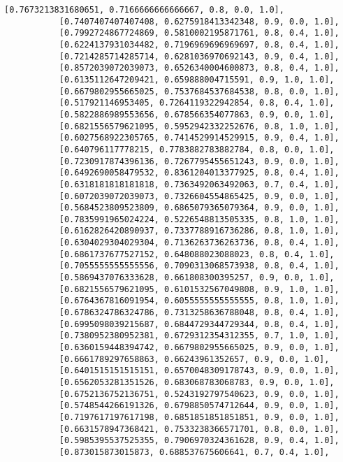 \documentclass[11pt]{article}
\begin{document}
\begin{Verbatim}[commandchars=\\\{\}]
           [0.7673213831680651, 0.7166666666666667, 0.8, 0.0, 1.0],
           [0.7407407407407408, 0.6275918413342348, 0.9, 0.0, 1.0],
           [0.7992724867724869, 0.5810002195871761, 0.8, 0.4, 1.0],
           [0.6224137931034482, 0.7196969696969697, 0.8, 0.4, 1.0],
           [0.7214285714285714, 0.6281036970692143, 0.9, 0.4, 1.0],
           [0.8572039072039073, 0.6526340004600873, 0.8, 0.4, 1.0],
           [0.6135112647209421, 0.659888004715591, 0.9, 1.0, 1.0],
           [0.6679802955665025, 0.7537684537684538, 0.8, 0.0, 1.0],
           [0.517921146953405, 0.7264119322942854, 0.8, 0.4, 1.0],
           [0.5822886989553656, 0.678566354077863, 0.9, 0.0, 1.0],
           [0.6821556579621095, 0.5952942332252676, 0.8, 1.0, 1.0],
           [0.6027568922305765, 0.7414529914529915, 0.9, 0.4, 1.0],
           [0.640796117778215, 0.7783882783882784, 0.8, 0.0, 1.0],
           [0.7230917874396136, 0.7267795455651243, 0.9, 0.0, 1.0],
           [0.6492690058479532, 0.8361204013377925, 0.8, 0.4, 1.0],
           [0.6318181818181818, 0.7363492063492063, 0.7, 0.4, 1.0],
           [0.6072039072039073, 0.7326604554865425, 0.9, 0.0, 1.0],
           [0.5684523809523809, 0.6865079365079364, 0.9, 0.0, 1.0],
           [0.7835991965024224, 0.5226548813505335, 0.8, 1.0, 1.0],
           [0.6162826420890937, 0.7337788916736286, 0.8, 1.0, 1.0],
           [0.6304029304029304, 0.7136263736263736, 0.8, 0.4, 1.0],
           [0.6861737677527152, 0.648088023088023, 0.8, 0.4, 1.0],
           [0.7055555555555556, 0.7090313068573938, 0.8, 0.4, 1.0],
           [0.5869437076333628, 0.661808300395257, 0.9, 0.0, 1.0],
           [0.6821556579621095, 0.6101532567049808, 0.9, 1.0, 1.0],
           [0.6764367816091954, 0.6055555555555555, 0.8, 1.0, 1.0],
           [0.6786324786324786, 0.7313258636788048, 0.8, 0.4, 1.0],
           [0.6995098039215687, 0.6844729344729344, 0.8, 0.4, 1.0],
           [0.7380952380952381, 0.6729312354312355, 0.7, 1.0, 1.0],
           [0.6360159448394742, 0.6679802955665025, 0.9, 0.0, 1.0],
           [0.6661789297658863, 0.66243961352657, 0.9, 0.0, 1.0],
           [0.6401515151515151, 0.6570048309178743, 0.9, 0.0, 1.0],
           [0.6562053281351526, 0.683068783068783, 0.9, 0.0, 1.0],
           [0.6752136752136751, 0.5243192797540623, 0.9, 0.0, 1.0],
           [0.5748544266191326, 0.6798850574712644, 0.9, 0.0, 1.0],
           [0.7197617197617198, 0.6851851851851851, 0.9, 0.0, 1.0],
           [0.6631578947368421, 0.7533238366571701, 0.8, 0.0, 1.0],
           [0.5985395537525355, 0.7906970324361628, 0.9, 0.4, 1.0],
           [0.873015873015873, 0.688537675606641, 0.7, 0.4, 1.0],

\end{Verbatim}
\end{document}
